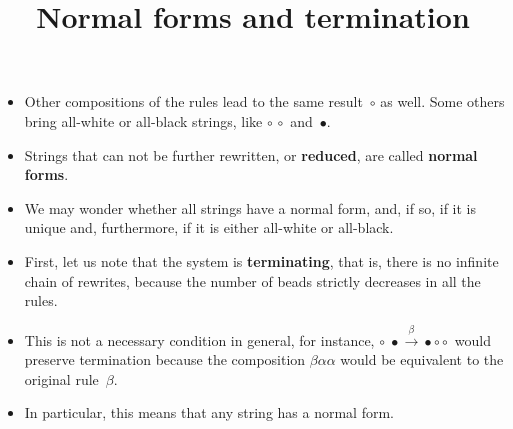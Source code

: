 \documentclass[wide]{slides}
\begin{document}
\begin{slide}
  \title{Normal forms and termination}

  \begin{itemize}

    \item Other compositions of the rules lead to the same
      result~\(\circ\) as well. Some others bring all\hyp{}white or
      all\hyp{}black strings, like \(\circ \, \circ\) and~\(\bullet\).

    \item Strings that can not be further rewritten, or
      \textbf{reduced}, are called \textbf{normal forms}.

    \item We may wonder whether all strings have a normal form, and,
      if so, if it is unique and, furthermore, if it is either
      all\hyp{}white or all\hyp{}black.

    \item First, let us note that the system is \textbf{terminating},
      that is, there is no infinite chain of rewrites, because the
      number of beads strictly decreases in all the rules.

    \item This is not a necessary condition in general, for instance,
      \(\circ \; \bullet \xrightarrow{\beta} \bullet \circ
      \circ\) would preserve termination because the composition
      \(\beta\alpha\alpha\) would be equivalent to the original
      rule~\(\beta\).

    \item In particular, this means that any string has a normal form.

  \end{itemize}
\end{slide}
\end{document}
